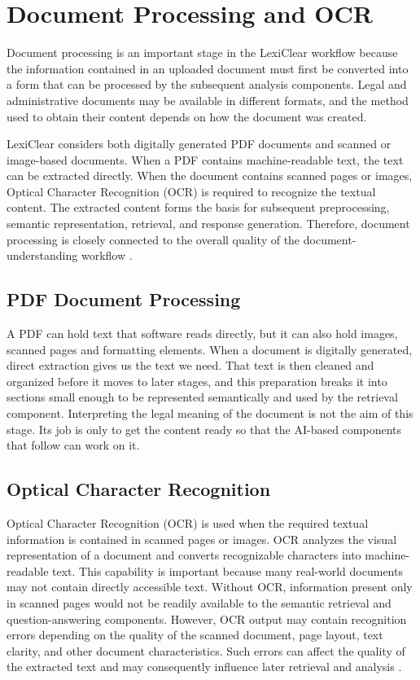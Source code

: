 \documentclass[12pt,a4paper,oneside]{report}
\begin{document}
\section{Document Processing and OCR}

Document processing is an important stage in the LexiClear workflow because
the information contained in an uploaded document must first be converted
into a form that can be processed by the subsequent analysis components.
Legal and administrative documents may be available in different formats,
and the method used to obtain their content depends on how the document was
created.

LexiClear considers both digitally generated PDF documents and scanned or
image-based documents. When a PDF contains machine-readable text, the text
can be extracted directly. When the document contains scanned pages or
images, Optical Character Recognition (OCR) is required to recognize the
textual content. The extracted content forms the basis for subsequent preprocessing,
semantic representation, retrieval, and response generation. Therefore,
document processing is closely connected to the overall quality of the
document-understanding workflow \cite{pramanik2025}.

\subsection{PDF Document Processing}

A PDF can hold text that software reads directly, but it can also hold images, scanned pages and formatting elements. When a document is digitally generated, direct extraction gives us the text we need. That text is then cleaned and organized before it moves to later stages, and this preparation breaks it into sections small enough to be represented semantically and used by the retrieval component. Interpreting the legal meaning of the document is not the aim of this stage. Its job is only to get the content ready so that the AI-based components that follow can work on it.

\subsection{Optical Character Recognition}

Optical Character Recognition (OCR) is used when the required textual
information is contained in scanned pages or images. OCR analyzes the visual
representation of a document and converts recognizable characters into
machine-readable text. This capability is important because many real-world documents may not
contain directly accessible text. Without OCR, information present only in
scanned pages would not be readily available to the semantic retrieval and
question-answering components. However, OCR output may contain recognition errors depending on the quality
of the scanned document, page layout, text clarity, and other document
characteristics. Such errors can affect the quality of the extracted text
and may consequently influence later retrieval and analysis \cite{pramanik2025}.
\end{document}

